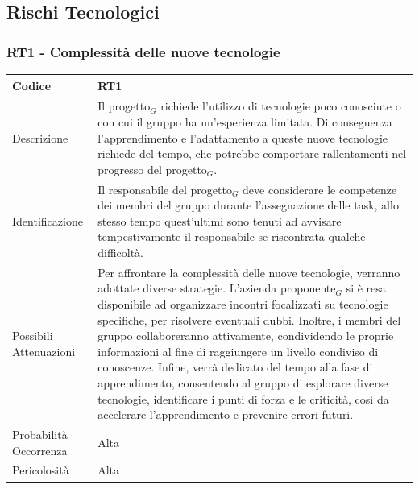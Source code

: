 \documentclass[10pt]{article}
\begin{document}
\subsection{Rischi Tecnologici}
    {\renewcommand{\arraystretch}{1.5}%
    \subsubsection{RT1 - Complessità delle nuove tecnologie}
    \label{RT1}
    \begin{tabularx}{\textwidth}{|l|X|}
    \hline
    \rowcolor{gray!25}
    Codice & RT1 \\
    \hline
    Descrizione & Il progetto$_G$ richiede l'utilizzo di tecnologie poco conosciute o con cui il gruppo ha un'esperienza limitata. Di conseguenza l'apprendimento e l'adattamento a queste nuove tecnologie richiede del tempo, che potrebbe comportare rallentamenti nel progresso del progetto$_G$.\\
    \hline
    Identificazione & Il responsabile del progetto$_G$ deve considerare le competenze dei membri del gruppo durante l'assegnazione delle task, allo stesso tempo quest'ultimi sono tenuti ad avvisare tempestivamente il responsabile se riscontrata qualche difficoltà.  \\
    \hline
    Possibili Attenuazioni & Per affrontare la complessità delle nuove tecnologie, verranno adottate diverse strategie. L'azienda proponente$_G$ si è resa disponibile ad organizzare incontri focalizzati su tecnologie specifiche, per risolvere eventuali dubbi. Inoltre, i membri del gruppo collaboreranno attivamente, condividendo le proprie informazioni al fine di raggiungere un livello condiviso di conoscenze. Infine, verrà dedicato del tempo alla fase di apprendimento, consentendo al gruppo di esplorare diverse tecnologie, identificare i punti di forza e le criticità, così da accelerare l'apprendimento e prevenire errori futuri.\\
    \hline
    Probabilità Occorrenza & Alta \\
    \hline
    Pericolosità & Alta \\ 
    \hline
    \end{tabularx}

    
}
\end{document}
